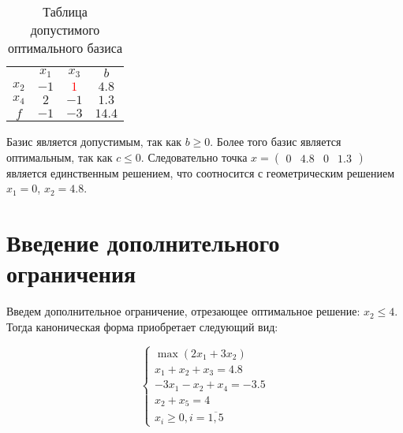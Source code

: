 
\begin{table}[H]
\begin{center}
	\def\tabcolsep{15pt}
	\def\arraystretch{1.3}
	\caption{Таблица допустимого оптимального базиса}
	\label{tab:simplex_3}
	\begin{tabular}{|c||c|c||c|}
		\hline
		 & $x_1$ & $x_3$ & $b$ \\ 
		\hhline{|=#==#=|}
		$x_2$ & $-1$ & \textcolor{red}{\boldmath$1$} & $4.8$ \\ 
		\hline
		$x_4$ & $2$ & $-1$ & $1.3$ \\ 
		\hhline{|=#==#=|}
		$f$ & $-1$ & $-3$ & $14.4$ \\ 
		\hline
	\end{tabular}
\end{center}
\end{table}

Базис является допустимым, так как $b \ge 0$. Более того базис является оптимальным, так как $c \le 0$. Следовательно точка $x = \begin{pmatrix} 0 & 4.8 & 0 & 1.3 \end{pmatrix}$ является единственным решением, что соотносится с геометрическим решением $x_1 = 0$, $x_2 = 4.8$.

\section{Введение дополнительного ограничения}

Введем дополнительное ограничение, отрезающее оптимальное решение: $x_2 \le 4$. Тогда каноническая форма приобретает следующий вид:

\begin{equation}
\label{eq:additional}
\begin{cases}
	\max \left( 2 x_1 + 3 x_2 \right) \\
	x_1 + x_2 + x_3 = 4.8 \\
	-3 x_1 - x_2 + x_4 = -3.5 \\
	x_2 + x_5 = 4 \\
	x_i \ge 0, i = \overline{1,5}
\end{cases}
\end{equation}

